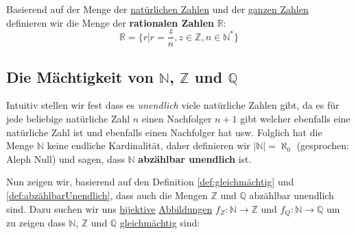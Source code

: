 \documentclass[../../main.tex]{subfiles}
\begin{document}
		\begin{definition}
			\label{def:RationaleZahlen}
			Basierend auf der Menge der \hyperref[def:NatürlicheZahlen]{natürlichen Zahlen} und der \hyperref[def:GanzeZahlen]{ganzen Zahlen} definieren wir die Menge der \textbf{rationalen Zahlen} $\mathbb{R}$: $$\mathbb{R} = \{r | r = \frac{z}{n}, z \in \mathbb{Z}, n \in \mathbb{N}^* \}$$
		\end{definition}
	
	

		
		
		\subsection*{Die Mächtigkeit von $\mathbb{N}$, $\mathbb{Z}$ und $\mathbb{Q}$}
		\begin{definition}
			\label{def:abzählbarUnendlich}
			Intuitiv stellen wir fest dass es \textit{unendlich} viele natürliche Zahlen gibt, da es für jede beliebige natürliche Zahl $n$ einen Nachfolger $n+1$ gibt welcher ebenfalls eine natürliche Zahl ist und ebenfalls einen Nachfolger hat usw. Folglich hat die Menge $\mathbb{N}$ keine endliche Kardinalität, daher definieren wir $|\mathbb{N}|=\aleph_0$ (gesprochen: Aleph Null) und sagen, dass $\mathbb{N}$ \textbf{abzählbar unendlich} ist. 
		\end{definition}
		
		Nun zeigen wir, basierend auf den Definition \ref{def:gleichmächtig} und \ref{def:abzählbarUnendlich}, dass auch die Mengen $\mathbb{Z}$ und $\mathbb{Q}$ abzählbar unendlich sind. Dazu suchen wir uns \hyperref[def:Bijektiv]{bijektive} \hyperref[def:Abbildung]{Abbildungen} $f_Z: \mathbb{N} \rightarrow \mathbb{Z}$ und $f_Q: \mathbb{N} \rightarrow \mathbb{Q}$ um zu zeigen dass $\mathbb{N}$, $\mathbb{Z}$ und $\mathbb{Q}$ \hyperref[def:gleichmächtig]{gleichmächtig} sind:
		
\end{document}
